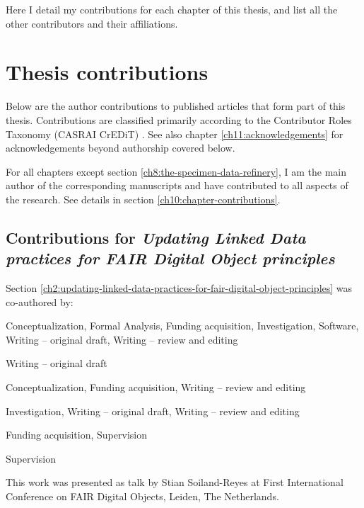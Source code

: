 \label{ch10:contributions} 

Here I detail my contributions for each chapter of this thesis, and
list all the other contributors and their affiliations.



\section{Thesis contributions}\label{ch10:my-contributions}

Below are the author contributions to published articles that form part
of this thesis. Contributions are classified primarily according to the
Contributor Roles Taxonomy (CASRAI CrEDiT) \cite{Brand 2015}. See 
also chapter \vref{ch11:acknowledgements} for acknowledgements beyond authorship covered below.

For all chapters except section \ref{ch8:the-specimen-data-refinery}, I am the main author of the corresponding
manuscripts and have contributed to all aspects of the research. See details in section \vref{ch10:chapter-contributions}.

\subsection{Contributions for \emph{Updating
Linked Data practices for FAIR Digital Object principles}}
Section \vref{ch2:updating-linked-data-practices-for-fair-digital-object-principles} was co-authored by:

\begin{description}
\tightlist
\item[Stian Soiland-Reyes]
Conceptualization, Formal Analysis, Funding acquisition, Investigation,
Software, Writing -- original draft, Writing -- review and editing
\item[Leyla Jael Castro]
Writing -- original draft
\item[Daniel Garijo]
Conceptualization, Funding acquisition, Writing -- review and editing
\item[Marc Portier]
Investigation, Writing -- original draft, Writing -- review and editing
\item[Carole Goble:]
Funding acquisition, Supervision
\item[Paul Groth]
Supervision
\end{description}

This work was presented as talk by Stian Soiland-Reyes at First International Conference on FAIR Digital Objects, Leiden, The Netherlands.

